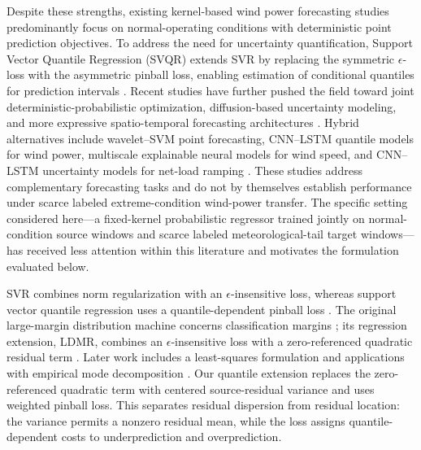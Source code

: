 \documentclass[a4paper]{cas-sc}
\begin{document}
Despite these strengths, existing kernel-based wind power forecasting studies predominantly focus on normal-operating conditions with deterministic point prediction objectives. To address the need for uncertainty quantification, Support Vector Quantile Regression (SVQR) extends SVR by replacing the symmetric $\epsilon$-loss with the asymmetric pinball loss, enabling estimation of conditional quantiles for prediction intervals \citep{ye2025nfs, tsvqr2023}. Recent studies have further pushed the field toward joint deterministic-probabilistic optimization, diffusion-based uncertainty modeling, and more expressive spatio-temporal forecasting architectures \citep{wang2025ensemble, liu2025diffusion, zhang2026gwsstnet}. {\color{blue}Hybrid alternatives include wavelet--SVM point forecasting, CNN--LSTM quantile models for wind power, multiscale explainable neural models for wind speed, and CNN--LSTM uncertainty models for net-load ramping \citep{abedinia2022multilevel,abedinia2024quantile,serttas2026multiscale,yu2025ramping}. These studies address complementary forecasting tasks and do not by themselves establish performance under scarce labeled extreme-condition wind-power transfer.} {\color{blue}The specific setting considered here---a fixed-kernel probabilistic regressor trained jointly on normal-condition source windows and scarce labeled meteorological-tail target windows---has received less attention within this literature and motivates the formulation evaluated below.}

{\color{blue}SVR combines norm regularization with an $\epsilon$-insensitive loss, whereas support vector quantile regression uses a quantile-dependent pinball loss \citep{smola2004tutorial,takeuchi2006nonparametric}. The original large-margin distribution machine concerns classification margins \citep{zhang2014large}; its regression extension, LDMR, combines an $\epsilon$-insensitive loss with a zero-referenced quadratic residual term \citep{rastogi2020ldmr}. Later work includes a least-squares formulation and applications with empirical mode decomposition \citep{gupta2021least,hazarika2023mode}. Our quantile extension replaces the zero-referenced quadratic term with centered source-residual variance and uses weighted pinball loss. This separates residual dispersion from residual location: the variance permits a nonzero residual mean, while the loss assigns quantile-dependent costs to underprediction and overprediction.}
\end{document}
